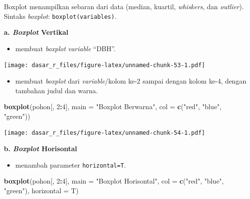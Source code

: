 \documentclass[
  12pt,
  a4paper,
]{scrbook}
\newenvironment{Shaded}{\begin{snugshade}}{\end{snugshade}}
\newcommand{\DataTypeTok}[1]{\textcolor[rgb]{0.13,0.29,0.53}{#1}}
\newcommand{\DecValTok}[1]{\textcolor[rgb]{0.00,0.00,0.81}{#1}}
\newcommand{\KeywordTok}[1]{\textcolor[rgb]{0.13,0.29,0.53}{\textbf{#1}}}
\newcommand{\NormalTok}[1]{#1}
\newcommand{\OperatorTok}[1]{\textcolor[rgb]{0.81,0.36,0.00}{\textbf{#1}}}
\newcommand{\StringTok}[1]{\textcolor[rgb]{0.31,0.60,0.02}{#1}}
\providecommand{\tightlist}{%
  \setlength{\itemsep}{0pt}\setlength{\parskip}{0pt}}
\begin{document}
Boxplot menampilkan sebaran dari data (median, kuartil, \emph{whiskers},
dan \emph{outlier}). Sintaks \emph{boxplot}:
\texttt{boxplot(variables)}.

\textbf{a. \emph{Boxplot} Vertikal}

\begin{itemize}
\tightlist
\item
  membuat \emph{boxplot} \emph{variable} ``DBH''.
\end{itemize}

\begin{Shaded}
\end{Shaded}

\texttt{[image: dasar\_r\_files/figure-latex/unnamed-chunk-53-1.pdf]}

\begin{itemize}
\tightlist
\item
  membuat \emph{boxplot} dari \emph{variable}/kolom ke-2 sampai dengan
  kolom ke-4, dengan tambahan judul dan warna.
\end{itemize}

\begin{Shaded}
\begin{Highlighting}[]
\KeywordTok{boxplot}\NormalTok{(pohon[, }\DecValTok{2}\OperatorTok{:}\DecValTok{4}\NormalTok{], }\DataTypeTok{main =} \StringTok{"Boxplot Berwarna"}\NormalTok{, }\DataTypeTok{col =} \KeywordTok{c}\NormalTok{(}\StringTok{"red"}\NormalTok{, }
    \StringTok{"blue"}\NormalTok{, }\StringTok{"green"}\NormalTok{))}
\end{Highlighting}
\end{Shaded}

\texttt{[image: dasar\_r\_files/figure-latex/unnamed-chunk-54-1.pdf]}

\textbf{b. \emph{Boxplot} Horisontal}

\begin{itemize}
\tightlist
\item
  menambah parameter \texttt{horizontal=T}.
\end{itemize}

\begin{Shaded}
\begin{Highlighting}[]
\KeywordTok{boxplot}\NormalTok{(pohon[, }\DecValTok{2}\OperatorTok{:}\DecValTok{4}\NormalTok{], }\DataTypeTok{main =} \StringTok{"Boxplot Horisontal"}\NormalTok{, }\DataTypeTok{col =} \KeywordTok{c}\NormalTok{(}\StringTok{"red"}\NormalTok{, }
    \StringTok{"blue"}\NormalTok{, }\StringTok{"green"}\NormalTok{), }\DataTypeTok{horizontal =}\NormalTok{ T)}
\end{Highlighting}
\end{Shaded}
\end{document}
